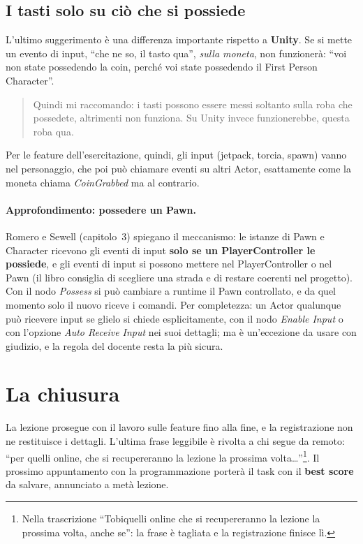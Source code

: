 \subsection{I tasti solo su ciò che si possiede}

L'ultimo suggerimento è una differenza importante rispetto a \textbf{Unity}. Se si
mette un evento di input, ``che ne so, il tasto qua'', \emph{sulla moneta}, non
funzionerà: ``voi non state possedendo la coin, perché voi state possedendo il
First Person Character''.
\begin{quote}
Quindi mi raccomando: i tasti possono essere messi soltanto sulla roba che
possedete, altrimenti non funziona. Su Unity invece funzionerebbe, questa roba
qua.
\end{quote}
Per le feature dell'esercitazione, quindi, gli input (jetpack, torcia, spawn)
vanno nel personaggio, che poi può chiamare eventi su altri Actor, esattamente
come la moneta chiama \emph{CoinGrabbed} ma al contrario.

\paragraph{Approfondimento: possedere un Pawn.} Romero e Sewell (capitolo~3)
spiegano il meccanismo: le istanze di Pawn e Character ricevono gli eventi di
input \textbf{solo se un PlayerController le possiede}, e gli eventi di input
si possono mettere nel PlayerController o nel Pawn (il libro consiglia di
scegliere una strada e di restare coerenti nel progetto). Con il nodo
\emph{Possess} si può cambiare a runtime il Pawn controllato, e da quel momento
solo il nuovo riceve i comandi. Per completezza: un Actor qualunque può
ricevere input se glielo si chiede esplicitamente, con il nodo \emph{Enable
Input} o con l'opzione \emph{Auto Receive Input} nei suoi dettagli; ma è
un'eccezione da usare con giudizio, e la regola del docente resta la più sicura.

\section{La chiusura}
\label{gd16:sec:chiusura}

La lezione prosegue con il lavoro sulle feature fino alla fine, e la
registrazione non ne restituisce i dettagli. L'ultima frase leggibile è rivolta
a chi segue da remoto: ``per quelli online, che si recupereranno la lezione la
prossima volta\dots''\footnote{Nella trascrizione ``Tobiquelli online che si
recupereranno la lezione la prossima volta, anche se'': la frase è tagliata e
la registrazione finisce lì.}. Il prossimo appuntamento con la programmazione
porterà il task con il \textbf{best score} da salvare, annunciato a metà
lezione.

